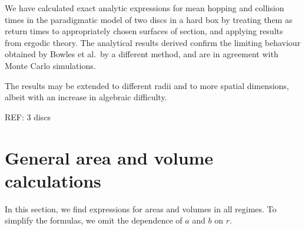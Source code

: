 \documentclass[superscriptaddress,pre,reprint,showpacs,twocolumn]{revtex4-1}
\newcommand{\etal}{et al.\ }
\begin{document}
We have calculated exact analytic expressions for mean hopping and
collision times in the paradigmatic model of two discs in a hard box
by treating them as return times to  appropriately chosen surfaces of section, 
and applying results from ergodic theory.
The analytical results derived 
confirm the limiting behaviour obtained
by Bowles \etal by a different method, and are in agreement with Monte Carlo simulations.

The results may be extended to different radii and to more spatial dimensions, albeit
with an increase in algebraic difficulty. 


REF: 3 discs


\appendix
\section{General area and volume calculations}
\label{app:area_volume}

In this section, we find expressions for areas and volumes in all 
regimes.
To simplify the formulas, we omit the dependence
of $a$ and $b$ on $r$.
\end{document}
